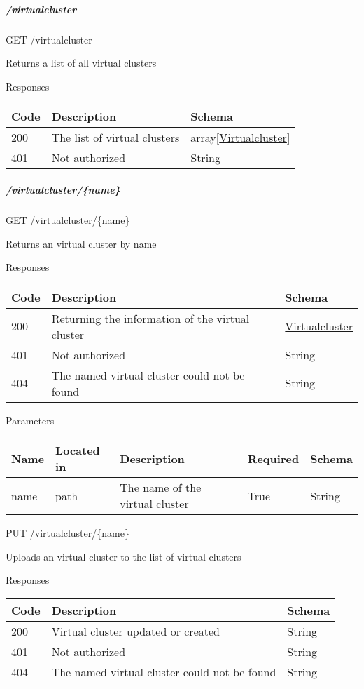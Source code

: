 
\subparagraph{/virtualcluster}\label{virtualcluster}

GET /virtualcluster

Returns a list of all virtual clusters

Responses

\begin{longtable}[]{@{}p{}p{}p{}@{}}
\toprule
Code & Description & Schema\tabularnewline
\midrule
\endhead
200 & The list of virtual clusters &
array{[}\protect\hyperlink{virtualcluster}{Virtualcluster}{]}\tabularnewline
401 & Not authorized & String\tabularnewline
\bottomrule
\end{longtable}

\hypertarget{virtualclustername}{%
\subparagraph{/virtualcluster/\{name\}}\label{virtualclustername}}

GET /virtualcluster/\{name\}

Returns an virtual cluster by name

Responses

\begin{longtable}[]{@{}p{}p{}p{}@{}}
\toprule
Code & Description & Schema\tabularnewline
\midrule
\endhead
200 & Returning the information of the virtual cluster &
\protect\hyperlink{virtualcluster}{Virtualcluster}\tabularnewline
401 & Not authorized & String\tabularnewline
404 & The named virtual cluster could not be found &
String\tabularnewline
\bottomrule
\end{longtable}

Parameters

\begin{longtable}[]{@{}p{}p{}p{}p{}p{}@{}}
\toprule
Name & Located in & Description & Required & Schema\tabularnewline
\midrule
\endhead
name & path & The name of the virtual cluster & True &
String\tabularnewline
\bottomrule
\end{longtable}

PUT /virtualcluster/\{name\}

Uploads an virtual cluster to the list of virtual clusters

Responses

\begin{longtable}[]{@{}p{}p{}p{}@{}}
\toprule
Code & Description & Schema\tabularnewline
\midrule
\endhead
200 & Virtual cluster updated or created & String\tabularnewline
401 & Not authorized & String\tabularnewline
404 & The named virtual cluster could not be found &
String\tabularnewline
\bottomrule
\end{longtable}

